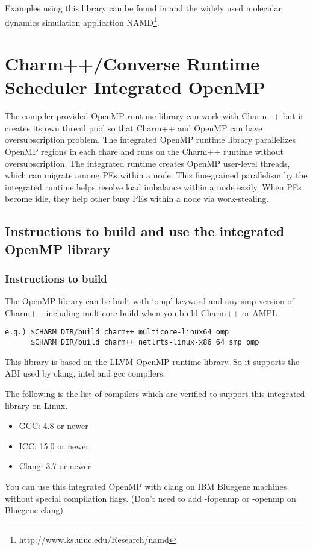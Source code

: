 Examples using this library can be found in  and the
widely used molecular dynamics simulation application
NAMD\footnote{http://www.ks.uiuc.edu/Research/namd}.

\section{Charm++/Converse Runtime Scheduler Integrated OpenMP}
The compiler-provided OpenMP runtime library can work with Charm++ but it creates its own thread pool so that Charm++ 
and OpenMP can have oversubscription problem. The integrated OpenMP runtime library parallelizes OpenMP regions in each chare 
and runs on the Charm++ runtime without oversubscription. The integrated runtime creates OpenMP user-level threads, which can migrate among PEs within 
a node. This fine-grained parallelism by the integrated runtime helps resolve load imbalance within a node easily. When PEs become idle, they help other busy PEs within a node via work-stealing.
\subsection{Instructions to build and use the integrated OpenMP library}
\subsubsection{Instructions to build}
The OpenMP library can be built with `omp' keyword and any smp version of Charm++ including multicore build when you build Charm++ or AMPI.\\
\begin{verbatim}
e.g.) $CHARM_DIR/build charm++ multicore-linux64 omp
      $CHARM_DIR/build charm++ netlrts-linux-x86_64 smp omp
\end{verbatim}
This library is based on the LLVM OpenMP runtime library. So it supports the ABI used by clang, intel and gcc compilers.

The following is the list of compilers which are verified to support this integrated library on Linux.
\begin{itemize}
  \item GCC: 4.8 or newer
  \item ICC: 15.0 or newer
  \item Clang: 3.7 or newer
\end{itemize}

You can use this integrated OpenMP with clang on IBM Bluegene machines without special compilation flags.  
(Don't need to add -fopenmp or -openmp on Bluegene clang)

